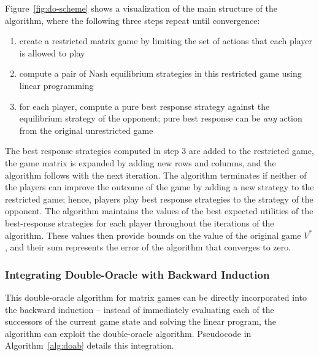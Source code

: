 Figure~\ref{fig:do-scheme} shows a visualization of the main structure of the algorithm, where the following three steps repeat until convergence:
\begin{enumerate}
\item create a restricted matrix game by limiting the set of actions that each player is allowed to play
\item compute a pair of Nash equilibrium strategies in this restricted game using linear programming
\item for each player, compute a pure best response strategy against the equilibrium strategy of the opponent; pure best response can be \emph{any} action from the original unrestricted game
\end{enumerate}
The best response strategies computed in step 3 are added to the restricted game, the game matrix is expanded by adding new rows and columns, and the algorithm follows with the next iteration. The algorithm terminates if neither of the players can improve the outcome of the game by adding a new strategy to the restricted game; hence, players play best response strategies to the strategy of the opponent. The algorithm maintains the values of the best expected utilities of the best-response strategies for each player throughout the iterations of the algorithm. These values then provide bounds on the value of the original game $V^*$, and their sum represents the error of the algorithm that converges to zero.

\subsubsection{Integrating Double-Oracle with Backward Induction}

This double-oracle algorithm for matrix games can be directly incorporated into the backward induction -- instead of immediately evaluating each of the successors of the current game state and solving the linear program, the algorithm can exploit the double-oracle algorithm. Pseudocode in Algorithm~\ref{alg:doab} details this integration. 

